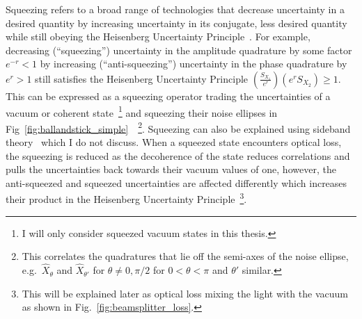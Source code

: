 Squeezing refers to a broad range of technologies that decrease uncertainty in a desired quantity by increasing uncertainty in its conjugate, less desired quantity while still obeying the Heisenberg Uncertainty Principle~\cite{Andersen_2016}. For example, decreasing (``squeezing'') uncertainty in the amplitude quadrature by some factor $e^{-r}<1$ by increasing (``anti-squeezing'') uncertainty in the phase quadrature by $e^r>1$ still satisfies the Heisenberg Uncertainty Principle $(\frac{S_{X_1}}{e^r}) (e^rS_{X_2})\geq1$.
This can be expressed as a squeezing operator trading the uncertainties of a vacuum or coherent state~\footnote{I will only consider squeezed vacuum states in this thesis.} and squeezing their noise ellipses in Fig~\ref{fig:ballandstick_simple}~\cite{danilishinQuantumMeasurementTheory2012}~\footnote{This correlates the quadratures that lie off the semi-axes of the noise ellipse, e.g.\ $\hat{X}_\theta$ and $\hat{X}_{\theta'}$ for $\theta\neq0,\pi/2$ for $0<\theta<\pi$ and $\theta'$ similar.}.
Squeezing can also be explained using sideband theory~\cite{danilishinQuantumMeasurementTheory2012} which I do not discuss.
When a squeezed state encounters optical loss, the squeezing is reduced as the decoherence of the state reduces correlations and pulls the uncertainties back towards their vacuum values of one, however, the anti-squeezed and squeezed uncertainties are affected differently which increases their product in the Heisenberg Uncertainty Principle~\footnote{This will be explained later as optical loss mixing the light with the vacuum as shown in Fig.~\ref{fig:beamsplitter_loss}.}. %

